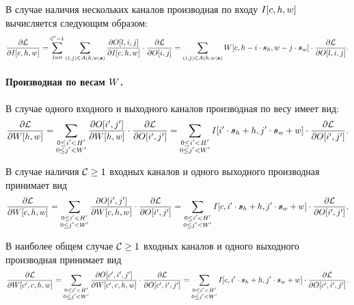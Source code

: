\documentclass{report}
\numberwithin{theorem}{chapter}
\numberwithin{statement}{chapter}
\numberwithin{lemma}{chapter}
\theoremstyle{definition}
\numberwithin{task}{chapter}
\theoremstyle{remark}
\numberwithin{example}{chapter}
\theoremstyle{definition}
\numberwithin{definition}{chapter}
\theoremstyle{remark}
\theoremstyle{remark}
\numberwithin{lyrics}{section}
\begin{document}
В случае наличия нескольких каналов производная по входу $I[c, h, w]$ вычисляется следующим образом:
\begin{equation}
\frac{\partial \mathcal{L} }{\partial I[c, h, w]}= \sum\limits_{l=0}^{\mathcal{C}' - 1}\sum\limits_{(i, j) \in A(h, w; \boldsymbol{s})} 
\frac{\partial O[l, i, j] }{\partial I[c, h, w]} \cdot \frac{\partial \mathcal{L} }{\partial O[i, j]} =
\sum\limits_{(i, j) \in A(h, w; \boldsymbol{s})} W[c, h - i \cdot \boldsymbol{s}_h, w - j \cdot \boldsymbol{s}_w] \cdot \frac{\partial \mathcal{L} }{\partial O[l, i, j]}.
\end{equation}

\paragraph{Производная по весам $W$.}
В случае одного входного и выходного каналов производная по весу имеет вид:
\begin{equation}
\frac{\partial \mathcal{L} }{\partial W[h, w]} = \sum\limits_{\substack{0 \le i' < H' \\ 0 \le j' < W'}} \frac{\partial O[i', j'] }{\partial W[h, w]} \cdot  \frac{\partial \mathcal{L} }{\partial O[i', j']} =  \sum\limits_{\substack{0 \le i' < H' \\ 0 \le j' < W'}} I[i' \cdot \boldsymbol{s}_h + h, j' \cdot \boldsymbol{s}_w + w] \cdot \frac{\partial \mathcal{L} }{\partial O[i', j']}.
\end{equation}

В случае наличия $\mathcal{C}\ge 1$ входных каналов и одного выходного производная принимает вид
\begin{equation}
\frac{\partial \mathcal{L} }{\partial W[c, h, w]} = \sum\limits_{\substack{0 \le i' < H' \\ 0 \le j' < W'}} \frac{\partial O[i', j'] }{\partial W[c, h, w]} \cdot  \frac{\partial \mathcal{L} }{\partial O[i', j']} =  \sum\limits_{\substack{0 \le i' < H' \\ 0 \le j' < W'}} I[c, i' \cdot \boldsymbol{s}_h + h, j' \cdot \boldsymbol{s}_w + w] \cdot \frac{\partial \mathcal{L} }{\partial O[i', j']}.
\end{equation}

В наиболее общем случае $\mathcal{C}\ge 1$ входных каналов и одного выходного производная принимает вид
\begin{gather}
\frac{\partial \mathcal{L} }{\partial W[c', c, h, w]} = \sum\limits_{\substack{0 \le i' < H' \\ 0 \le j' < W'}} \frac{\partial O[c', i', j'] }{\partial W[c', c, h, w]} \cdot  \frac{\partial \mathcal{L} }{\partial O[c', i', j']} = \sum\limits_{\substack{0 \le i' < H' \\ 0 \le j' < W'}} I[c, i' \cdot \boldsymbol{s}_h + h, j' \cdot \boldsymbol{s}_w + w] \cdot \frac{\partial \mathcal{L} }{\partial O[c', i', j']}.
\end{gather}
\end{document}
